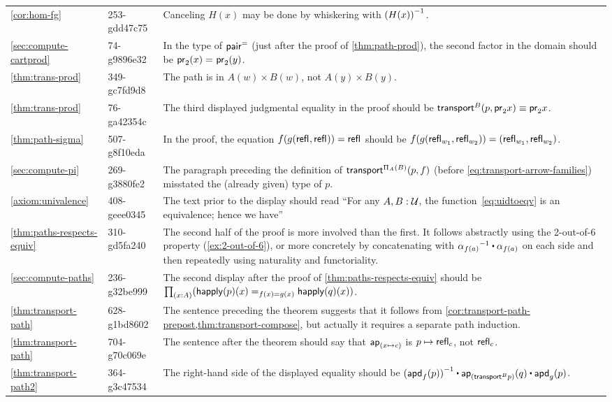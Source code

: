 \documentclass[
%
%
11pt %
]{article}
\begin{document}
\begin{longtable}{llp{10.5cm}}
  \cref{cor:hom-fg}
  & 253-gdd47c75
  & Canceling $H(x)$ may be done by whiskering with $\mathord{{(H(x))}^{-1}}$.\\
  \cref{sec:compute-cartprod}
  & 74-g9896e32
  & In the type of $\mathsf{pair}^{\mathord{=}}$ (just after the proof of \cref{thm:path-prod}), the second factor in the domain should be $\mathsf{pr}_{2}(x) =_{} \mathsf{pr}_{2}(y)$.\\
  \cref{thm:trans-prod}
  & 349-gc7fd9d8
  & The path is in $A(w)\times B(w)$, not $A(y)\times B(y)$.\\
  \cref{thm:trans-prod}
  & 76-ga42354c
  & The third displayed judgmental equality in the proof should be $\mathsf{transport}^{B}(p,\mathsf{pr}_{2} x) \equiv \mathsf{pr}_{2} x$.\\
  \cref{thm:path-sigma}
  & 507-g8f10eda
  & In the proof, the equation $f(g(\mathsf{refl}_{},\mathsf{refl}_{}))=\mathsf{refl}_{}$ should be $f (g(\mathsf{refl}_{w_1},\mathsf{refl}_{w_2})) = (\mathsf{refl}_{w_1},\mathsf{refl}_{w_2})$.\\
  \cref{sec:compute-pi}
  & 269-g3880fe2
  & The paragraph preceding the definition of $\mathsf{transport}^{\Pi_A(B)}(p,f)$ (before \cref{eq:transport-arrow-families}) misstated the (already given) type of $p$.\\
  \cref{axiom:univalence}
  & 408-geee0345
  & The text prior to the display should read ``For any $A,B:\mathcal{U}$, the function~\eqref{eq:uidtoeqv} is an equivalence; hence we have''\\
  \cref{thm:paths-respects-equiv}
  & 310-gd5fa240
  & The second half of the proof is more involved than the first.
  It follows abstractly using the 2-out-of-6 property (\cref{ex:2-out-of-6}), or more concretely by concatenating with $\opp{\alpha_{f(a)}} \ct {\alpha_{f(a)}}$ on each side and then repeatedly using naturality and functoriality.\\
  \cref{sec:compute-paths}
  & 236-g32be999
  & The second display after the proof of \cref{thm:paths-respects-equiv} should be $\prd{x:A} (\id[f(x)=g(x)] {\happly(p)(x)}{\happly(q)(x)})$.\\
  \cref{thm:transport-path}
  & 628-g1bd8602
  & The sentence preceding the theorem suggests that it follows from \cref{cor:transport-path-prepost,thm:transport-compose}, but actually it requires a separate path induction.\\
  \cref{thm:transport-path}
  & 704-g70c069e
  & The sentence after the theorem should say that $\mathsf{ap}_{(x \mapsto c)}$ is $p \mapsto\mathsf{refl}_{c}$, not $\mathsf{refl}_{c}$.\\
  \cref{thm:transport-path2}
  & 364-g3c47534
  & The right-hand side of the displayed equality should be $\opp{(\apdfunc{f}(p))} \ct \apfunc{(\transfibf{B}{p})}(q) \ct \apdfunc{g}(p)$.\\

\end{longtable}
\end{document}
